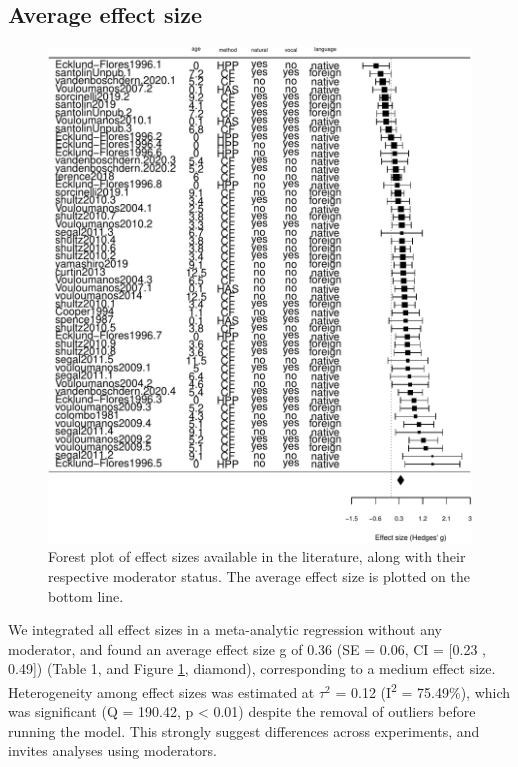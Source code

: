 \documentclass[
  man]{apa6}
\begin{document}
\hypertarget{average-effect-size}{%
\subsection{Average effect size}\label{average-effect-size}}

\begin{figure}
\centering
\includegraphics{MA_speech_pref_files/figure-latex/forest-1.pdf}
\caption{\label{fig:forest}Forest plot of effect sizes available in the literature, along with their respective moderator status. The average effect size is plotted on the bottom line.}
\end{figure}

We integrated all effect sizes in a meta-analytic regression without any moderator, and found an average effect size g of 0.36 (SE = 0.06, CI = {[}0.23 , 0.49{]}) (Table 1, and Figure \ref{fig:forest}, diamond), corresponding to a medium effect size.
Heterogeneity among effect sizes was estimated at \(\tau^2\) = 0.12 (I\textsuperscript{2} = 75.49\%), which was significant (Q = 190.42, p \textless{} 0.01) despite the removal of outliers before running the model. This strongly suggest differences across experiments, and invites analyses using moderators.
\end{document}
